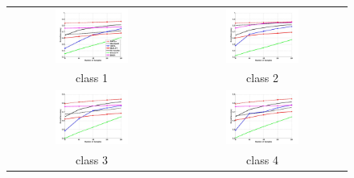 \begin{figure}[h]
	\centering
	\begin{tabular}{cc}
		\includegraphics[width=0.45\textwidth]{appendix/tables/MNIST_Rate_3_class_1.jpg} & 
		\includegraphics[width=0.45\textwidth]{appendix/tables/MNIST_Rate_3_class_2.jpg} \\
		class 1 & class 2\\
		\includegraphics[width=0.45\textwidth]{appendix/tables/MNIST_Rate_3_class_3.jpg} & 
		\includegraphics[width=0.45\textwidth]{appendix/tables/MNIST_Rate_3_class_4.jpg} \\
		class 3 & class 4\\
	\end{tabular}
\end{figure}
